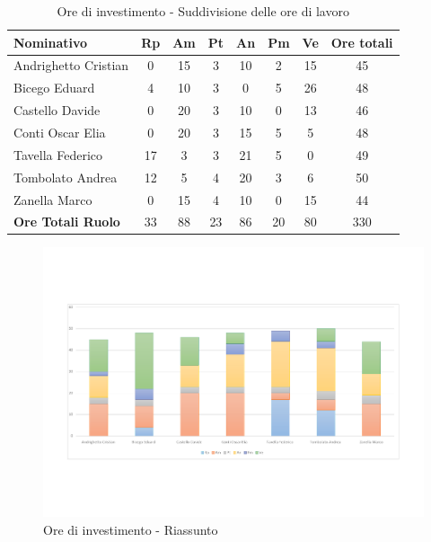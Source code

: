 \documentclass[../PianoProgetto.tex]{subfiles}
\begin{document}
	\begin{table}[H]
		\begin{tabularx}{\textwidth}{l  * {6}{C}  c}
			\toprule
			\textbf{Nominativo} & \textbf{Rp} & \textbf{Am} & \textbf{Pt} 
						& \textbf{An} & \textbf{Pm} & \textbf{Ve} & \textbf{Ore totali} \\
			\midrule
			Andrighetto Cristian  & 0     & 15    & 3     & 10    & 2     & 15    & 45 \\
			Bicego Eduard  & 4     & 10    & 3     & 0     & 5     & 26    & 48 \\
			Castello Davide  & 0     & 20    & 3     & 10    & 0     & 13    & 46 \\
			Conti Oscar Elia  & 0     & 20    & 3     & 15    & 5     & 5     & 48 \\
			Tavella Federico  & 17    & 3     & 3     & 21    & 5     & 0     & 49 \\
			Tombolato Andrea  & 12    & 5     & 4     & 20    & 3     & 6     & 50 \\
			Zanella Marco & 0     & 15    & 4     & 10    & 0     & 15    & 44 \\
			\midrule
			\textbf{Ore Totali Ruolo} & 33    & 88    & 23    & 86    & 20    & 80    & 330 \\
			\bottomrule
		\end{tabularx}
		\caption{Ore di investimento - Suddivisione delle ore di lavoro}
		\label{tab:investimento_ore}
	\end{table}
\vfill	

	
	\begin{figure}[H]
		\centering
		\includegraphics[width=\textwidth , trim=2cm 4cm 2cm 4cm]{grafici/Riepilogo/Investimento/ore-persona}
			\caption{Ore di investimento - Riassunto}
		\label{fig:BarChart-investimento_ore}
	\end{figure}
\vfill
\newpage
\vfill	
\end{document}
